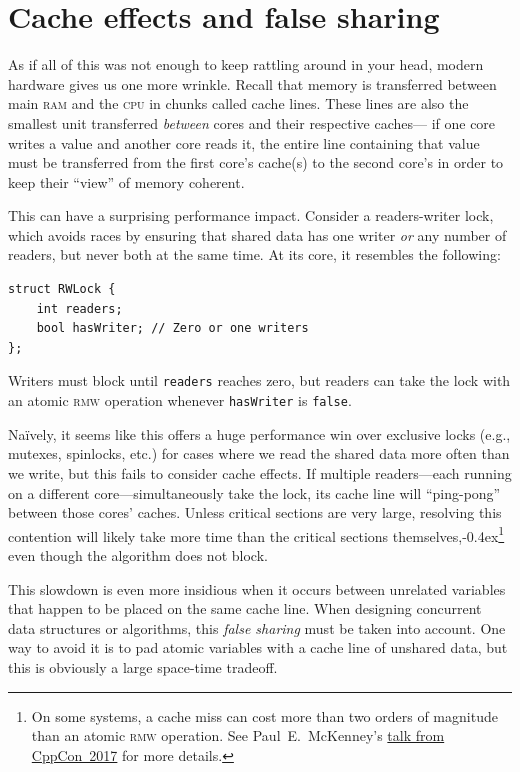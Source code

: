 \documentclass[fontsize=10pt, oneside]{scrartcl}
\newcommand{\codesize}{\fontsize{\bodyfontsize}{\bodybaselineskip}}
\newcommand{\punckern}{\kern-0.4ex}
\newcommand{\introduce}[1]{\textit{#1}}
\newenvironment{colfigure}
  {\par\vspace{1\baselineskip minus 0.5\baselineskip}\noindent\minipage{\linewidth}}
  {\endminipage\vspace{1\baselineskip minus 0.7\baselineskip}}
\begin{document}
\section{Cache effects and false sharing}
\label{false-sharing}

As if all of this was not enough to keep rattling around in your head,
modern hardware gives us one more wrinkle.
Recall that memory is transferred between main \textsc{ram} and the \textsc{cpu}
in chunks called cache lines.
These lines are also the smallest unit transferred \emph{between} cores and their respective caches---
if one core writes a value and another core reads it,
the entire line containing that value must be transferred from the first core's cache(s) to the second core's in order to keep their ``view'' of memory coherent.

This can have a surprising performance impact.
Consider a readers-writer lock,
which avoids races by ensuring that shared data has one writer \emph{or} any number of readers, but never both at the same time.
At its core, it resembles the following:
\begin{colfigure}
\begin{verbatim}
struct RWLock {
    int readers;
    bool hasWriter; // Zero or one writers
};
\end{verbatim}
\end{colfigure}
Writers must block until \texttt{readers} reaches zero,
but readers can take the lock with an atomic \textsc{rmw} operation whenever \texttt{hasWriter} is \texttt{false}.

Naïvely, it seems like this offers a huge performance win over exclusive locks (e.g., mutexes, spinlocks, etc.) for cases where we read the shared data
more often than we write,
but this fails to consider cache effects.
If multiple readers---each running on a different core---simultaneously take the lock,
its cache line will ``ping-pong'' between those cores' caches.
Unless critical sections are very large,
resolving this contention will likely take more time than the critical sections themselves,\punckern\footnote{On some systems, a cache miss can cost more than
two orders of magnitude than an atomic \textsc{rmw} operation.
See Paul~E.\ McKenney's
\href{https://www.youtube.com/watch?v=74QjNwYAJ7M}{talk from CppCon~2017}
for more details.}
even though the algorithm does not block.

This slowdown is even more insidious when it occurs between unrelated variables that happen to be placed on the same cache line.
When designing concurrent data structures or algorithms,
this \introduce{false sharing} must be taken into account.
One way to avoid it is to pad atomic variables with a cache line of unshared data, but this is obviously a large space-time tradeoff.
\end{document}
